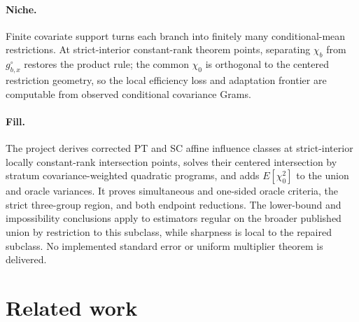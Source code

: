 \documentclass{article}
\begin{document}
\paragraph{Niche.} Finite covariate support turns each branch into finitely many conditional-mean restrictions. At strict-interior constant-rank theorem points, separating \(\chi_b\) from \(g^{\circ}_{b,x}\) restores the product rule; the common \(\chi_0\) is orthogonal to the centered restriction geometry, so the local efficiency loss and adaptation frontier are computable from observed conditional covariance Grams.

\paragraph{Fill.} The project derives corrected PT and SC affine influence classes at strict-interior locally constant-rank intersection points, solves their centered intersection by stratum covariance-weighted quadratic programs, and adds \(E[\chi_0^2]\) to the union and oracle variances. It proves simultaneous and one-sided oracle criteria, the strict three-group region, and both endpoint reductions. The lower-bound and impossibility conclusions apply to estimators regular on the broader published union by restriction to this subclass, while sharpness is local to the repaired subclass. No implemented standard error or uniform multiplier theorem is delivered.

\section{Related work}
\end{document}
